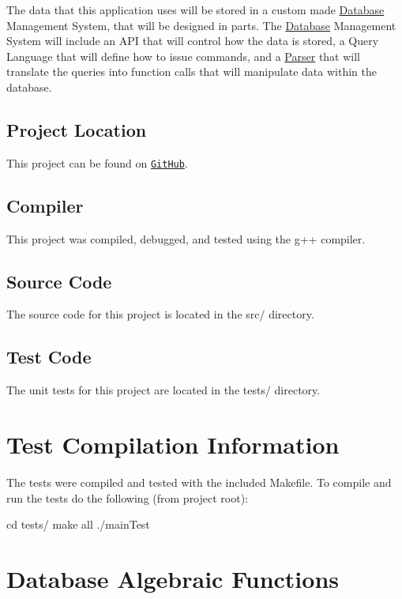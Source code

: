 The data that this application uses will be stored in a custom made \hyperlink{class_database}{Database} Management System, that will be designed in parts. The \hyperlink{class_database}{Database} Management System will include an A\-P\-I that will control how the data is stored, a Query Language that will define how to issue commands, and a \hyperlink{class_parser}{Parser} that will translate the queries into function calls that will manipulate data within the database.\hypertarget{index_location}{}\subsection{Project Location}\label{index_location}
This project can be found on \href{https://github.com/csce-315-501-f/project-1}{\tt Git\-Hub}. \hypertarget{index_compiler}{}\subsection{Compiler}\label{index_compiler}
This project was compiled, debugged, and tested using the g++ compiler. \hypertarget{index_source_code}{}\subsection{Source Code}\label{index_source_code}
The source code for this project is located in the src/ directory. \hypertarget{index_test_code}{}\subsection{Test Code}\label{index_test_code}
The unit tests for this project are located in the tests/ directory.\hypertarget{index_test_info}{}\section{Test Compilation Information}\label{index_test_info}
The tests were compiled and tested with the included Makefile. To compile and run the tests do the following (from project root)\-: 
\begin{DoxyPre}
{\ttfamily cd tests/
make all
./mainTest}\end{DoxyPre}
\hypertarget{index_db_func_info}{}\section{Database Algebraic Functions}\label{index_db_func_info}
